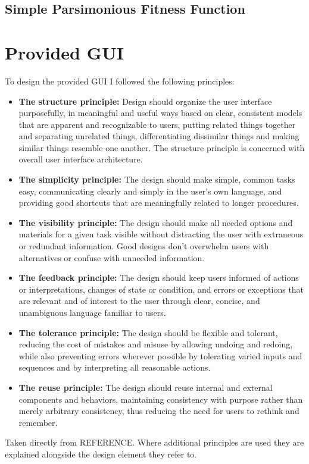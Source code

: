 \subsection{Simple Parsimonious Fitness Function}

\section{Provided GUI}
\label{sec:provgui}
To design the provided GUI I followed the following principles:
\begin{itemize}
 \item \textbf{The structure principle:} Design should organize the user interface purposefully, in meaningful and useful ways based on clear, consistent models that are apparent and recognizable to users, putting related things together and separating unrelated things, differentiating dissimilar things and making similar things resemble one another. 
The structure principle is concerned with overall user interface architecture.
\item \textbf{The simplicity principle:} The design should make simple, common tasks easy, communicating clearly and simply in the user's own language, and providing good shortcuts that are meaningfully related to longer procedures.
\item \textbf{The visibility principle:} The design should make all needed options and materials for a given task visible without distracting the user with extraneous or redundant information. 
Good designs don't overwhelm users with alternatives or confuse with unneeded information.
\item \textbf{The feedback principle:} The design should keep users informed of actions or interpretations, changes of state or condition, and errors or exceptions that are relevant and of interest to the user through clear, concise, and unambiguous language familiar to users.
\item \textbf{The tolerance principle:} The design should be flexible and tolerant, reducing the cost of mistakes and misuse by allowing undoing and redoing, while also preventing errors wherever possible by tolerating varied inputs and sequences and by interpreting all reasonable actions.
\item \textbf{The reuse principle:} The design should reuse internal and external components and behaviors, maintaining consistency with purpose rather than merely arbitrary consistency, thus reducing the need for users to rethink and remember.
\end{itemize}
Taken directly from REFERENCE.
Where additional principles are used they are explained alongside the design element they refer to.

